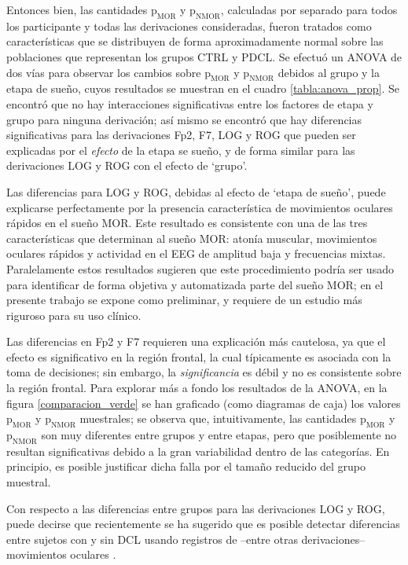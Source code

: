 \documentclass[12pt,letterpaper]{book}
\begin{document}
Entonces bien, las cantidades $\text{p}_{\text{MOR}}$ y $\text{p}_{\text{NMOR}}$, calculadas por separado para todos los participante y todas las derivaciones consideradas, fueron tratados como características que se distribuyen de forma aproximadamente normal sobre las poblaciones que representan los grupos CTRL y PDCL.
%
Se efectuó un ANOVA de dos vías para observar los cambios sobre $\text{p}_{\text{MOR}}$ y $\text{p}_{\text{NMOR}}$ debidos al grupo y la etapa de sueño, cuyos resultados se muestran en el cuadro \ref{tabla:anova_prop}.
%
Se encontró que no hay interacciones significativas entre los factores de etapa y grupo para ninguna derivación; así mismo se encontró que hay diferencias significativas para las derivaciones Fp2, F7, LOG y ROG que pueden ser explicadas por el \textit{efecto} de la etapa se sueño, y de forma similar para las derivaciones LOG y ROG con el efecto de `grupo'.

Las diferencias para LOG y ROG, debidas al efecto de `etapa de sueño', puede explicarse perfectamente por la presencia característica de movimientos oculares rápidos en el sueño MOR. 
%
Este resultado es consistente con una de las tres características que determinan al sueño MOR: atonía muscular, movimientos oculares rápidos y actividad en el EEG de amplitud baja y frecuencias mixtas.
%
Paralelamente estos resultados sugieren que este procedimiento podría ser usado para identificar de forma objetiva y automatizada parte del sueño MOR; en el presente trabajo se expone como preliminar, y requiere de un estudio más riguroso para su uso clínico.

Las diferencias en Fp2 y F7 requieren una explicación más cautelosa, ya que el efecto es significativo en la región frontal, la cual típicamente es asociada con la toma de decisiones; sin embargo, la \textit{significancia} es débil y no es consistente sobre la región frontal.
%
Para explorar más a fondo los resultados de la ANOVA, en la figura \ref{comparacion_verde} se han graficado (como diagramas de caja) los valores $\text{p}_{\text{MOR}}$ y $\text{p}_{\text{NMOR}}$ muestrales; se observa que, intuitivamente, las cantidades $\text{p}_{\text{MOR}}$ y $\text{p}_{\text{NMOR}}$ son muy diferentes entre grupos y entre etapas, pero que posiblemente no resultan significativas debido a la gran variabilidad dentro de las categorías.
%
En principio, es posible justificar dicha falla por el tamaño reducido del grupo muestral.

Con respecto a las diferencias entre grupos para las derivaciones LOG y ROG, puede decirse que recientemente se ha sugerido que es posible detectar diferencias entre sujetos con y sin DCL usando registros de --entre otras derivaciones-- movimientos oculares \cite{FRONTIERS}.
\end{document}
